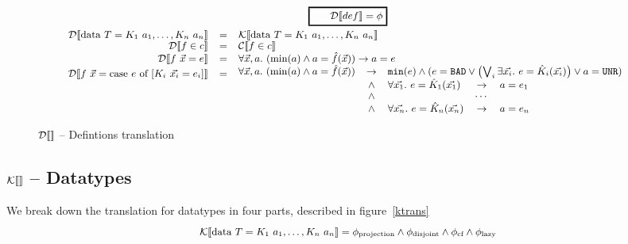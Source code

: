 \documentclass[preprint]{sigplanconf}
\begin{document}
\begin{figure}
\[
\begin{array}{rcl}
  \multicolumn{3}{c}{\ruleform{\dtrans{def} = \phi}} \\[2.5mm]
  \dtrans{\mbox{data } T = K_1~a_1, \dots, K_n~a_n} &=& \ktrans{\mbox{data } T = K_1~a_1, \dots, K_n~a_n} \\
  \dtrans{f \in c} &=& \ctrans{f \in c}\\
  \dtrans{f~\vec{x} = e} &=& \forall \vec{x},a.~ (\min{a} \land a =
  \full{f}(\vec{x})) \to a = e \\
   \raisebox{ 0.5 cm }{$\dtrans{f~\vec{x} = \mbox{case } e \mbox{ of } [K_i~\vec{x_i} = e_i]}$} &\raisebox{0.5cm}{=}&  \hspace{-0.18cm} \begin{array}{rclcl}
     \forall \vec{x},a.~(\mbox{min}(a) \land a = \full{f}(\vec{x})) &\to&
     \multicolumn{3}{c}{  \texttt{min}(e) \land (e = \texttt{BAD} \lor
       \left(\bigvee_i \exists \vec{x_i}.~e = \full{K}_i(\vec{x_i})\right) \lor a = \texttt{UNR})} \\
     &\land& \forall \vec{x_1}.~e = \full{K}_1(\vec{x_1}) &\to& a = e_1 \\
     &\land& & \cdots & \\
     &\land& \forall \vec{x_n}.~e = \full{K}_n(\vec{x_n}) &\to& a = e_n \\
   \end{array} 
\end{array}
\]
\caption{$\dtrans{}$ -- Defintions translation}
 \label{dtrans}
\end{figure}



\subsection{$\ktrans{}$ -- Datatypes}
We break down the translation for datatypes in four parts, described in figure~\ref{ktrans}
$$\ktrans{\mbox{data } T = K_1~a_1, \dots, K_n~a_n} = \phi_\text{projection} \land \phi_\text{disjoint} \land \phi_\text{cf} \land \phi_\text{lazy}$$
\end{document}
